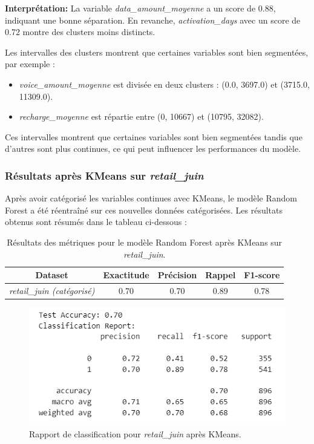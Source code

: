 \textbf{Interprétation:} La variable \textit{data\_amount\_moyenne} a un score de 0.88, indiquant une bonne séparation. En revanche, \textit{activation\_days} avec un score de 0.72 montre des clusters moins distincts.

Les intervalles des clusters montrent que certaines variables sont bien segmentées, par exemple :
\begin{itemize}
    \item \textit{voice\_amount\_moyenne} est divisée en deux clusters : (0.0, 3697.0) et (3715.0, 11309.0).
    \item \textit{recharge\_moyenne} est répartie entre (0, 10667) et (10795, 32082).
\end{itemize}

Ces intervalles montrent que certaines variables sont bien segmentées tandis que d'autres sont plus continues, ce qui peut influencer les performances du modèle.

\subsubsection{Résultats après KMeans sur \textit{retail\_juin}}

Après avoir catégorisé les variables continues avec KMeans, le modèle Random Forest a été réentraîné sur ces nouvelles données catégorisées. Les résultats obtenus sont résumés dans le tableau ci-dessous :

\begin{table}[H]
    \centering
    \begin{tabular}{|c|c|c|c|c|}
        \hline
        \textbf{Dataset} & \textbf{Exactitude} & \textbf{Précision} & \textbf{Rappel} & \textbf{F1-score} \\
        \hline
        \textit{retail\_juin (catégorisé)} & 0.70 & 0.70 & 0.89 & 0.78 \\
        \hline
    \end{tabular}
    \caption{Résultats des métriques pour le modèle Random Forest après KMeans sur \textit{retail\_juin}.}
\end{table}

\begin{figure}[H]
    \centering
    \includegraphics[width=0.6\linewidth]{capture_modele_17.png}
    \caption{Rapport de classification pour \textit{retail\_juin} après KMeans.}
    \label{fig:classification_kmeans}
\end{figure}


